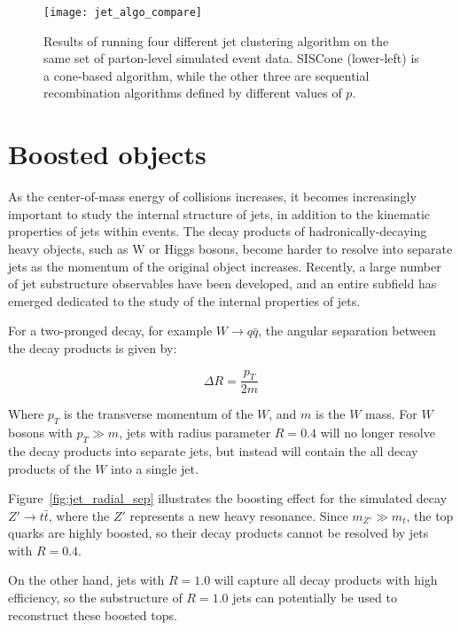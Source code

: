 \begin{figure}[h!]
    \centering
\texttt{[image: jet\_algo\_compare]}
\caption{Results of running four different jet clustering algorithm on the same set of parton-level simulated event data.
SISCone (lower-left) is a cone-based algorithm, while the other three are sequential recombination algorithms defined
by different values of $p$.}
\label{fig:jet_algo_compare}
\end{figure}\cite{jet-antikt-algo}

\section{Boosted objects}\label{sec:jet_substructure}

As the center-of-mass energy of collisions increases, it becomes increasingly important to study the internal structure
of jets, in addition to the kinematic properties of jets within events.
The decay products of hadronically-decaying heavy objects, such as W or Higgs bosons,
become harder to resolve into separate jets as the momentum of the original object increases.
Recently, a large number of jet substructure observables have been developed, and an entire subfield has emerged
dedicated to the study of the internal properties of jets.

For a two-pronged decay, for example $W \rightarrow q\bar{q}$, the angular separation between the decay products is given by:

\begin{equation}\label{eq:jet_boosted_sep}
    \Delta R = \frac{p_{T}}{2m}
\end{equation}

Where $p_T$ is the transverse momentum of the $W$, and $m$ is the $W$ mass.
For $W$ bosons with $p_T \gg m$, jets with radius parameter $R = 0.4$ will no longer resolve the decay products into separate jets,
but instead will contain the all decay products of the $W$ into a single jet.

Figure~\ref{fig:jet_radial_sep} illustrates the boosting effect for the simulated decay $Z'\rightarrow t\bar{t}$,
where the $Z'$ represents a new heavy resonance.
Since $m_{Z'} \gg m_{t}$, the top quarks are highly boosted, so their decay products cannot be resolved by jets with $R=0.4$.

On the other hand, jets with $R = 1.0$ will capture all decay products with high efficiency,
so the substructure of $R=1.0$ jets can potentially be used to reconstruct these boosted tops.


